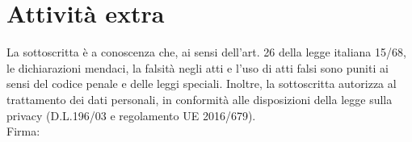 \documentclass[10pt,a4paper]{moderncv}		%
\begin{document}
\vspace{0.25cm}


\section{Attività extra}




\vspace{\fill}
{\footnotesize\noindent
La sottoscritta è a conoscenza che, ai sensi dell'art. 26 della legge italiana 15/68, le dichiarazioni mendaci, la falsità negli atti e l'uso di atti falsi sono puniti ai sensi del codice penale e delle leggi speciali. Inoltre, la sottoscritta autorizza al trattamento dei dati personali, in conformità alle disposizioni della legge sulla privacy  (D.L.196/03 e regolamento UE 2016/679).}
\vspace*{0.8cm}\\
 Firma: 
\end{document}
